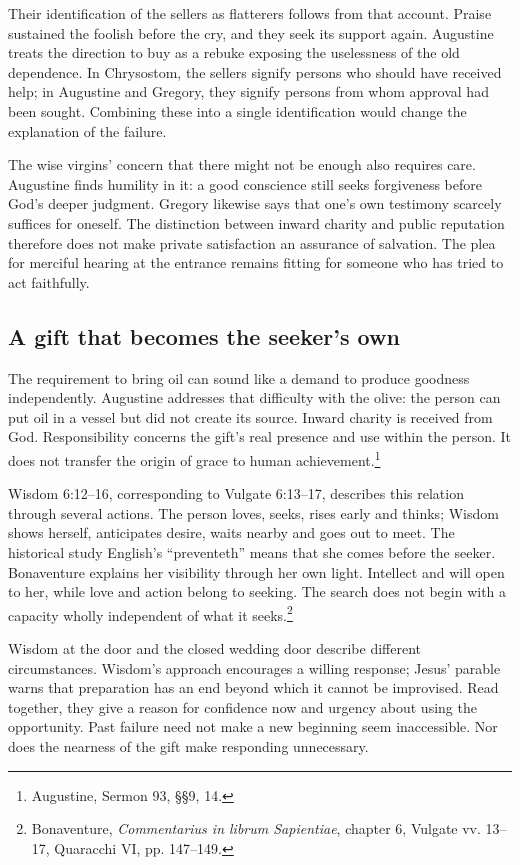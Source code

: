 Their identification of the sellers as flatterers follows from that account. Praise sustained the foolish before the cry, and they seek its support again. Augustine treats the direction to buy as a rebuke exposing the uselessness of the old dependence. In Chrysostom, the sellers signify persons who should have received help; in Augustine and Gregory, they signify persons from whom approval had been sought. Combining these into a single identification would change the explanation of the failure.

The wise virgins' concern that there might not be enough also requires care. Augustine finds humility in it: a good conscience still seeks forgiveness before God's deeper judgment. Gregory likewise says that one's own testimony scarcely suffices for oneself. The distinction between inward charity and public reputation therefore does not make private satisfaction an assurance of salvation. The plea for merciful hearing at the entrance remains fitting for someone who has tried to act faithfully.

\subsection{A gift that becomes the seeker's own}
The requirement to bring oil can sound like a demand to produce goodness independently. Augustine addresses that difficulty with the olive: the person can put oil in a vessel but did not create its source. Inward charity is received from God. Responsibility concerns the gift's real presence and use within the person. It does not transfer the origin of grace to human achievement.\footnote{Augustine, Sermon 93, §§9, 14.}

Wisdom 6:12--16, corresponding to Vulgate 6:13--17, describes this relation through several actions. The person loves, seeks, rises early and thinks; Wisdom shows herself, anticipates desire, waits nearby and goes out to meet. The historical study English's ``preventeth'' means that she comes before the seeker. Bonaventure explains her visibility through her own light. Intellect and will open to her, while love and action belong to seeking. The search does not begin with a capacity wholly independent of what it seeks.\footnote{Bonaventure, \textit{Commentarius in librum Sapientiae}, chapter 6, Vulgate vv. 13--17, Quaracchi VI, pp. 147--149.}

Wisdom at the door and the closed wedding door describe different circumstances. Wisdom's approach encourages a willing response; Jesus' parable warns that preparation has an end beyond which it cannot be improvised. Read together, they give a reason for confidence now and urgency about using the opportunity. Past failure need not make a new beginning seem inaccessible. Nor does the nearness of the gift make responding unnecessary.

